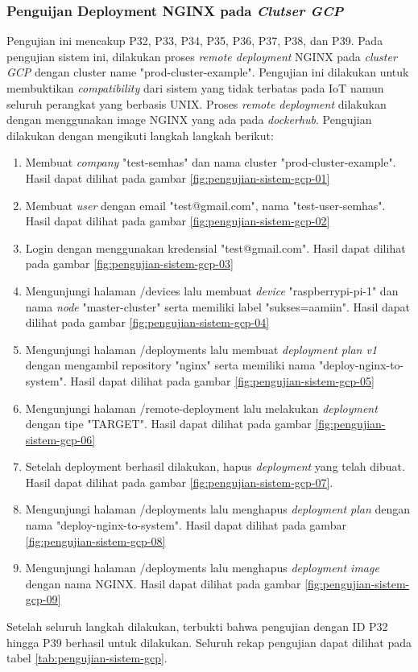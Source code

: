 \subsubsection{Penguijan Deployment NGINX pada \textit{Clutser GCP}}

Pengujian ini mencakup P32, P33, P34, P35, P36, P37, P38, dan P39. Pada pengujian sistem ini, dilakukan proses \textit{remote deployment} NGINX pada \textit{cluster GCP} dengan cluster name "prod-cluster-example". Pengujian ini dilakukan untuk membuktikan \textit{compatibility} dari sistem yang tidak terbatas pada IoT namun seluruh perangkat yang berbasis UNIX. Proses \textit{remote deployment} dilakukan dengan menggunakan image NGINX yang ada pada \textit{dockerhub}. Pengujian dilakukan dengan mengikuti langkah langkah berikut:

\begin{enumerate}
  \item Membuat \textit{company} "test-semhas" dan nama cluster "prod-cluster-example". Hasil dapat dilihat pada gambar \ref{fig:pengujian-sistem-gcp-01}
  \item Membuat \textit{user} dengan email "test@gmail.com", nama "test-user-semhas". Hasil dapat dilihat pada gambar \ref{fig:pengujian-sistem-gcp-02}
  \item Login dengan menggunakan kredensial "test@gmail.com". Hasil dapat dilihat pada gambar \ref{fig:pengujian-sistem-gcp-03}
  \item Mengunjungi halaman /devices lalu membuat \textit{device} "raspberrypi-pi-1" dan nama \textit{node} "master-cluster" serta memiliki label "sukses=aamiin". Hasil dapat dilihat pada gambar \ref{fig:pengujian-sistem-gcp-04}
  \item Mengunjungi halaman /deployments lalu membuat \textit{deployment plan v1} dengan mengambil repository "nginx" serta memiliki nama "deploy-nginx-to-system". Hasil dapat dilihat pada gambar \ref{fig:pengujian-sistem-gcp-05}
  \item Mengunjungi halaman /remote-deployment lalu melakukan \textit{deployment} dengan tipe "TARGET". Hasil dapat dilihat pada gambar \ref{fig:pengujian-sistem-gcp-06}
  \item Setelah deployment berhasil dilakukan, hapus \textit{deployment} yang telah dibuat. Hasil dapat dilihat pada gambar \ref{fig:pengujian-sistem-gcp-07}.
  \item Mengunjungi halaman /deployments lalu menghapus \textit{deployment plan} dengan nama "deploy-nginx-to-system". Hasil dapat dilihat pada gambar \ref{fig:pengujian-sistem-gcp-08}
  \item Mengunjungi halaman /deployments lalu menghapus \textit{deployment image} dengan nama NGINX. Hasil dapat dilihat pada gambar \ref{fig:pengujian-sistem-gcp-09}
\end{enumerate}

Setelah seluruh langkah dilakukan, terbukti bahwa pengujian dengan ID P32 hingga P39 berhasil untuk dilakukan. Seluruh rekap pengujian dapat dilihat pada tabel \ref{tab:pengujian-sistem-gcp}.